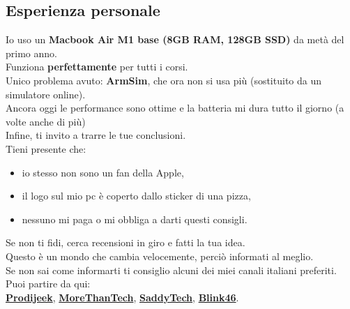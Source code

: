 \documentclass{article}
\begin{document}
\subsection{Esperienza personale}
Io uso un \textbf{Macbook Air M1 base (8GB RAM, 128GB SSD)} da metà del primo anno.\\
Funziona \textbf{perfettamente} per tutti i corsi.\\
Unico problema avuto: \textbf{ArmSim}, che ora non si usa più (sostituito da un simulatore online).\\
Ancora oggi le performance sono ottime e la batteria mi dura tutto il giorno (a volte anche di più)\\
Infine, ti invito a trarre le tue conclusioni.\\
Tieni presente che:
\begin{itemize}
\item io stesso non sono un fan della Apple,
\item il logo sul mio pc è coperto dallo sticker di una pizza,
\item nessuno mi paga o mi obbliga a darti questi consigli.
\end{itemize}%
Se non ti fidi, cerca recensioni in giro e fatti la tua idea.\\
Questo è un mondo che cambia velocemente, perciò informati al meglio.\\
Se non sai come informarti ti consiglio alcuni dei miei canali italiani preferiti. Puoi partire da qui:\\
\href{https://www.youtube.com/@Prodigeek}{\textbf{Prodijeek}}, \href{https://www.youtube.com/@MoreThanTech}{\textbf{MoreThanTech}}, \href{https://www.youtube.com/@SaddyTech}{\textbf{SaddyTech}}, \href{https://www.youtube.com/@Blink46yt}{\textbf{Blink46}}.
\end{document}
